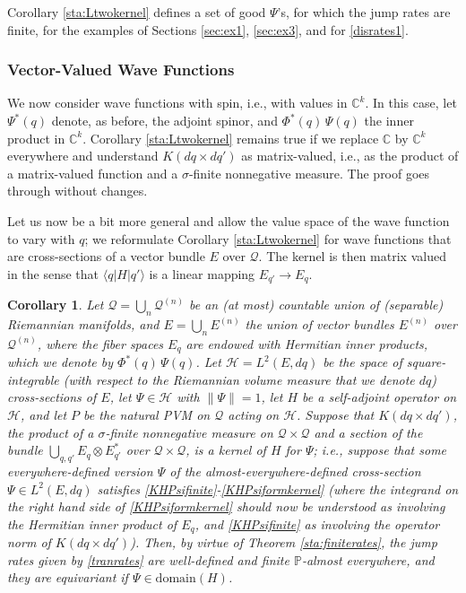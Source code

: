 \documentclass[12pt]{article}
\newcommand{\CCC}{\mathbb{C}} %
\newcommand{\1}{\mathbf{1}} %
\newcommand{\Hilbert}{\mathscr{H}}
\renewcommand{\sp}[2]{\langle #1 | #2 \rangle} %
\newcommand{\conf}{\mathcal{Q}} %
\newcommand{\measure}{\mathbb{P}} %
\newcommand{\pov}{{P}}%
\newtheorem{corollary}{Corollary}
\begin{document}
Corollary \ref{sta:Ltwokernel} defines a set  of good $\Psi$'s, for
which the jump rates are finite, for the examples of Sections
\ref{sec:ex1}, \ref{sec:ex3}, and for  \eqref{disrates1}.


\subsubsection{Vector-Valued Wave Functions}

We now consider wave functions with spin, i.e., with values in
$\CCC^k$. In this case, let $\Psi^*(q)$ denote, as before, the adjoint
spinor, and $\Phi^*(q)\, \Psi(q)$ the inner product in $\CCC^k$.
Corollary \ref{sta:Ltwokernel} remains true if we replace $\CCC$ by
$\CCC^k$ everywhere and understand $K(dq \times dq')$ as
matrix-valued, i.e., as the product of a matrix-valued function and a
$\sigma$-finite nonnegative measure. The proof goes through without
changes.

Let us now be  a bit more general and allow the value space
of the wave function to vary with $q$; we reformulate Corollary
\ref{sta:Ltwokernel} for wave functions that are cross-sections of a
vector bundle $E$ over $\conf$. The kernel is then matrix valued in
the sense that $\sp{q}{H|q'}$ is a linear mapping $E_{q'} \to E_q$.

\begin{corollary}\label{sta:bundlekernel}
   Let $\conf = \bigcup_n \conf^{(n)}$ be an (at most) countable union
   of (separable) Riemannian manifolds, and $E = \bigcup_n E^{(n)}$
   the union of vector bundles $E^{(n)}$ over $\conf^{(n)}$, where the
   fiber spaces $E_q$ are endowed with Hermitian inner products, which
   we denote by $\Phi^*(q) \, \Psi(q)$. Let $\Hilbert = L^2(E,dq)$ be
   the space of square-integrable (with respect to the Riemannian
   volume measure that we denote $dq$) cross-sections of $E$, let
   $\Psi \in \Hilbert$ with $\|\Psi\| =1$, let $H$ be a self-adjoint
   operator on $\Hilbert$, and let $\pov$ be the natural PVM on
   $\conf$ acting on $\Hilbert$.  Suppose that $K(dq \times dq')$, the
   product of a $\sigma$-finite nonnegative measure on $\conf \times
   \conf$ and a section of the bundle $\bigcup_{q,q'} E_q \otimes
   E^*_{q'}$ over $\conf \times \conf$, is a kernel of $H$ for $\Psi$;
   i.e., suppose that some everywhere-defined version $\Psi$ of the
   almost-everywhere-defined cross-section $\Psi \in L^2(E,dq)$
   satisfies \eqref{KHPsifinite}-\eqref{KHPsiformkernel} (where the
   integrand on the right hand side of \eqref{KHPsiformkernel} should
   now be understood as involving the Hermitian inner product of
   $E_q$, and \eqref{KHPsifinite} as involving the operator norm of
   $K(dq \times dq')$).  Then, by virtue of Theorem
   \ref{sta:finiterates}, the jump rates given by \eqref{tranrates}
   are well-defined and finite $\measure$-almost everywhere, and they
   are equivariant if $\Psi \in \mathrm{domain}(H)$.
\end{corollary}
\end{document}
